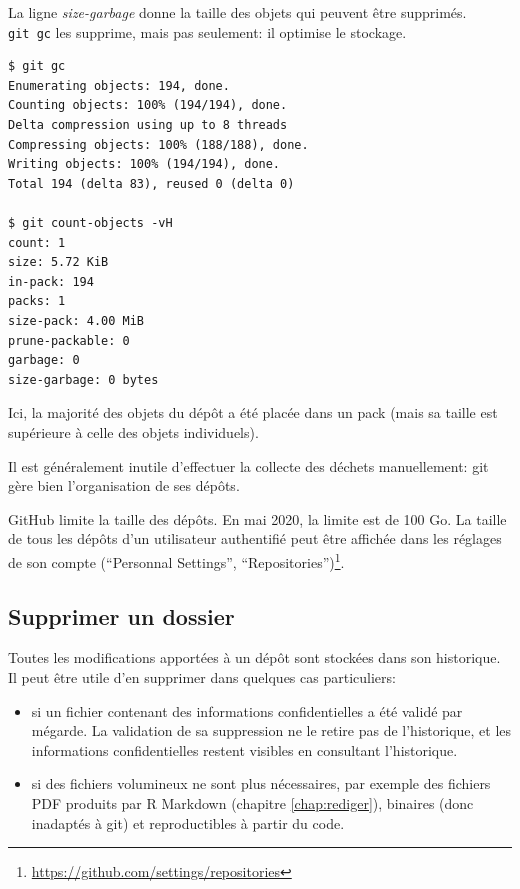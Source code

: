 \documentclass[
  11pt,
  french,
  a4paper,
  extrafontsizes,onecolumn,openright
  ]{memoir}
\providecommand{\tightlist}{%
  \setlength{\itemsep}{0pt}\setlength{\parskip}{0pt}}
\begin{document}
La ligne \emph{size-garbage} donne la taille des objets qui peuvent être supprimés.
\texttt{git\ gc} les supprime, mais pas seulement: il optimise le stockage.

\begin{verbatim}
$ git gc
Enumerating objects: 194, done.
Counting objects: 100% (194/194), done.
Delta compression using up to 8 threads
Compressing objects: 100% (188/188), done.
Writing objects: 100% (194/194), done.
Total 194 (delta 83), reused 0 (delta 0)

$ git count-objects -vH
count: 1
size: 5.72 KiB
in-pack: 194
packs: 1
size-pack: 4.00 MiB
prune-packable: 0
garbage: 0
size-garbage: 0 bytes
\end{verbatim}

Ici, la majorité des objets du dépôt a été placée dans un pack (mais sa taille est supérieure à celle des objets individuels).

Il est généralement inutile d'effectuer la collecte des déchets manuellement: git gère bien l'organisation de ses dépôts.

GitHub limite la taille des dépôts.
En mai 2020, la limite est de 100 Go.
La taille de tous les dépôts d'un utilisateur authentifié peut être affichée dans les réglages de son compte (``Personnal Settings'', ``Repositories'')\footnote{\url{https://github.com/settings/repositories}}.

\hypertarget{supprimer-un-dossier}{%
\subsection{Supprimer un dossier}\label{supprimer-un-dossier}}

Toutes les modifications apportées à un dépôt sont stockées dans son historique.
Il peut être utile d'en supprimer dans quelques cas particuliers:

\begin{itemize}
\tightlist
\item
  si un fichier contenant des informations confidentielles a été validé par mégarde.
  La validation de sa suppression ne le retire pas de l'historique, et les informations confidentielles restent visibles en consultant l'historique.
\item
  si des fichiers volumineux ne sont plus nécessaires, par exemple des fichiers PDF produits par R Markdown (chapitre \ref{chap:rediger}), binaires (donc inadaptés à git) et reproductibles à partir du code.
\end{itemize}
\end{document}
